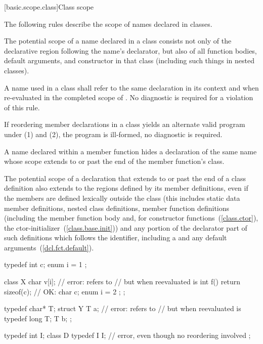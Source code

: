 [basic.scope.class]{Class scope}

\pnum
{}%
The following rules describe the scope of names declared in classes.

\begin{enumeraten}
\item The potential scope of a name declared in a class consists not
only of the declarative region following the name's declarator,
but also of all function bodies, default arguments, and constructor
 in that class (including such
things in nested classes).
\item A name  used in a class  shall refer to the same
declaration in its context and when re-evaluated in the completed scope
of . No diagnostic is required for a violation of this rule.
\item If reordering member declarations in a class yields an alternate
valid program under (1) and (2), the program is ill-formed, no
diagnostic is required.
\item A name declared within a member function hides a declaration of
the same name whose scope extends to or past the end of the member
function's class.
\item The potential scope of a declaration that extends to or past the
end of a class definition also extends to the regions defined by its
member definitions, even if the members are defined lexically outside
the class (this includes static data member definitions, nested class
definitions, member function definitions (including the member function
body and, for constructor functions~(\ref{class.ctor}),
the ctor-initializer~(\ref{class.base.init})) and any portion of the
declarator part of such definitions which follows the identifier,
including a  and any default
arguments~(\ref{dcl.fct.default}). \enterexample

\begin{codeblock}
typedef int  c;
enum { i = 1 };

class X {
    char  v[i];				// error:  refers to 
					// but when reevaluated is 
    int  f() { return sizeof(c); }	//  OK: 
    char  c;
    enum { i = 2 };
};

typedef char*  T;
struct Y {
    T  a;			// error:  refers to 
				// but when reevaluated is 
    typedef long  T;
    T  b;
};

typedef int I;
class D {
    typedef I I;		// error, even though no reordering involved
};
\end{codeblock}
\exitexampleb
\end{enumeraten}


